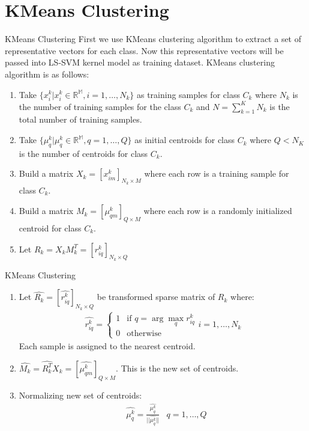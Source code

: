 \documentclass{beamer}
\newcounter{saveenumi}
\newcommand{\seti}{\setcounter{saveenumi}{\value{enumi}}}
\newcommand{\conti}{\setcounter{enumi}{\value{saveenumi}}}
\begin{document}
\section{KMeans Clustering}
\begin{frame}{KMeans Clustering}
    First we use KMeans clustering algorithm to extract a set of representative vectors for each class.
    Now this representative vectors will be passed into LS-SVM kernel model as training dataset.
    KMeans clustering algorithm is as follows:
    \begin{enumerate}
        \item Take $\{x_{i}^{k}|x_{i}^{k} \in \mathbb{R^{M}}, i=1,\ldots,N_{k}\}$ as training samples for class $C_{k}$ where
        $N_{k}$ is the number of training samples for the class $C_{k}$ and $N = \sum_{k=1}^{K}N_{k}$ is the total
        number of training samples.
        \item Take $\{\mu_{q}^{k}|\mu_{q}^{k} \in \mathbb{R^{M}}, q=1,\ldots,Q \}$ as initial centroids
        for class $C_{k}$ where $Q<N_{K}$ is the number of centroids for class $C_{k}$.
        \item Build a matrix $X_{k} = [x_{im}^{k}]_{N_{k} \times M}$ where each row is a training sample for class $C_{k}$.
        \item Build a matrix $M_{k} = [\mu_{qm}^{k}]_{Q \times M}$ where each row is a randomly initialized centroid
        for class $C_{k}$.
        \item Let $R_{k} = X_{k}M_{k}^{T} = [r_{iq}^{k}]_{N_{k}\times Q}$
      \seti
\end{enumerate}
\end{frame}
\begin{frame}{KMeans Clustering}
    \begin{enumerate}
    \conti
          \item Let $\hat{R_{k}} = [\hat{r_{iq}^{k}}]_{N_{k}\times Q}$ be transformed sparse matrix of $R_{k}$ where:
        \begin{align*}
            \hat{r_{iq}^{k}} = \begin{cases}
                                   1 & \text{if } q = \arg \max_{q}r_{iq}^{k} \\
                                   0 & \text{otherwise}
            \end{cases}
            i = 1,\ldots,N_{k}
        \end{align*}
        Each sample is assigned to the nearest centroid.
        \item $\hat{M_{k}} = \hat{R_{k}^{T}}X_{k} = [\hat{\mu_{qm}^{k}}]_{Q \times M}$. This is the new set of centroids.
        \item Normalizing new set of centroids:
        \begin{align*}
            & \hat{\mu_{q}^{k}} = \frac{\hat{\mu_{q}^{k}}}{|| \hat{\mu_{q}^{k}} ||}
            & q=1,\ldots,Q
        \end{align*}
        \seti
    \end{enumerate}
\end{frame}
\end{document}
